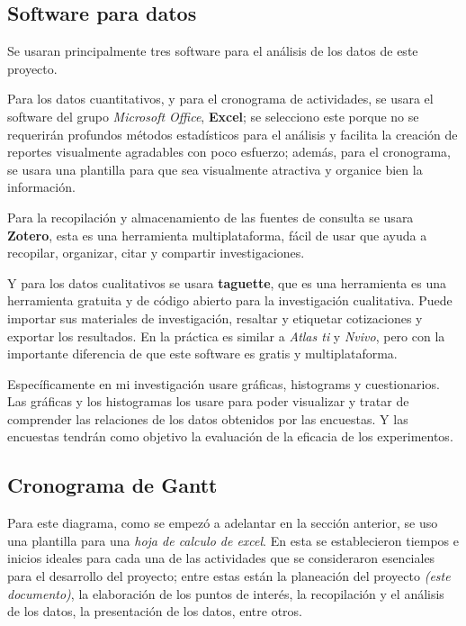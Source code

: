 \documentclass[12pt]{article}
\begin{document}
	\subsection {Software para datos}
		\par Se usaran principalmente tres software para el análisis de los datos de este proyecto.
		\par Para los datos cuantitativos, y para el cronograma de actividades, se usara el software del grupo \textit{Microsoft Office}, \textbf{Excel}; se selecciono este porque no se requerirán profundos métodos estadísticos para el análisis y facilita la creación de reportes visualmente agradables con poco esfuerzo; además, para el cronograma, se usara una plantilla para que sea visualmente atractiva y organice bien la información.
		\par Para la recopilación y almacenamiento de las fuentes de consulta se usara \textbf{Zotero}, esta es una herramienta multiplataforma, fácil de usar que ayuda a recopilar, organizar, citar y compartir investigaciones.
		\par Y para los datos cualitativos se usara \textbf{taguette}, que es una herramienta es una herramienta gratuita y de código abierto para la investigación cualitativa. Puede importar sus materiales de investigación, resaltar y etiquetar cotizaciones y exportar los resultados. En la práctica es similar a \textit{Atlas ti} y \textit{Nvivo}, pero con la importante diferencia de que este software es gratis y multiplataforma. 
		
		\par Específicamente en mi investigación usare gráficas, histograms y cuestionarios. Las gráficas y los histogramas los usare para poder visualizar y tratar de comprender las relaciones de los datos obtenidos por las encuestas. Y las encuestas tendrán como objetivo la evaluación de la eficacia de los experimentos.
		
	
	\subsection {Cronograma de Gantt}
	
		\par Para este diagrama, como se empezó a adelantar en la sección anterior, se uso una plantilla \cite{plantilla} para una \textit{hoja de calculo de excel}. En esta se establecieron tiempos e inicios ideales para cada una de las actividades que se consideraron esenciales para el desarrollo del proyecto; entre estas están la planeación del proyecto \textit{(este documento)}, la elaboración de los puntos de interés, la recopilación y el análisis de los datos, la presentación de los datos, entre otros.
		
\end{document}
